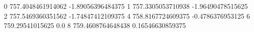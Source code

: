 0 757.4048461914062 -1.89056396484375
1 757.3305053710938 -1.96490478515625
2 757.5469360351562 -1.74847412109375
4 758.8167724609375 -0.4786376953125
6 759.29541015625 0.0
8 759.4608764648438 0.16546630859375
